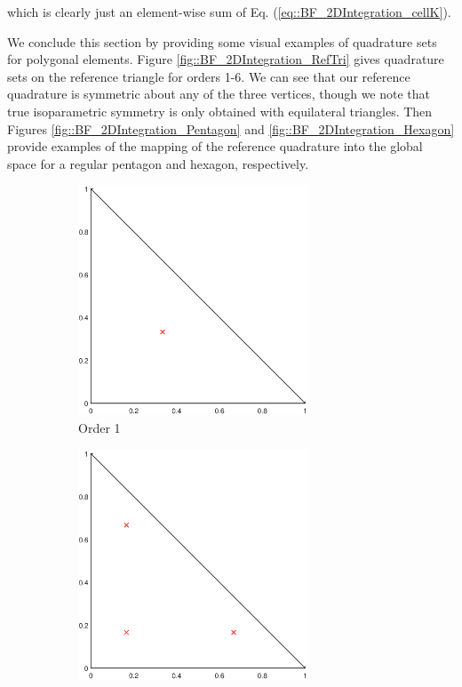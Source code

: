 \noindent which is clearly just an element-wise sum of Eq. (\ref{eq::BF_2DIntegration_cellK}).

We conclude this section by providing some visual examples of quadrature sets for polygonal elements. Figure \ref{fig::BF_2DIntegration_RefTri} gives quadrature sets on the reference triangle for orders 1-6. We can see that our reference quadrature is symmetric about any of the three vertices, though we note that true isoparametric symmetry is only obtained with equilateral triangles. Then Figures \ref{fig::BF_2DIntegration_Pentagon} and \ref{fig::BF_2DIntegration_Hexagon} provide examples of the mapping of the reference quadrature into the global space for a regular pentagon and hexagon, respectively. 

\begin{figure}
\centering
{
	\begin{subfigure}[b]{0.475\textwidth}
		\centering
		\label{subfig::2DInt_RefTri_Q1}
		\includegraphics[width=0.75\textwidth]{figures/sec_BF/RefTriQuad_Q1.eps}
		\caption{Order 1}
	\end{subfigure}
	\hfill
	\begin{subfigure}[b]{0.475\textwidth}
		\centering
		\label{subfig::2DInt_RefTri_Q2}
		\includegraphics[width=0.75\textwidth]{figures/sec_BF/RefTriQuad_Q2.eps}

\end{subfigure}}
\end{figure}
